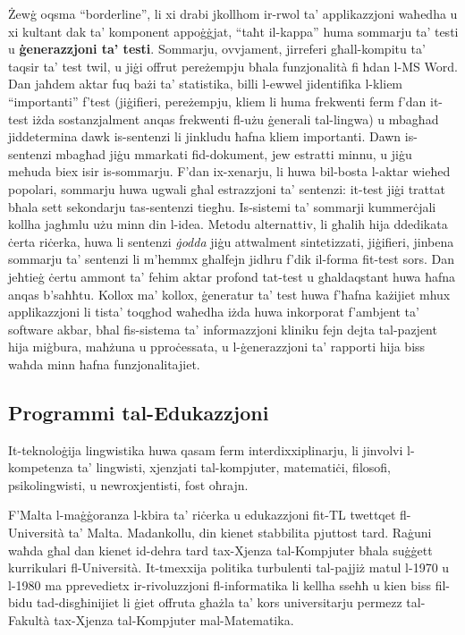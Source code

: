 \documentclass[]{../../metanetpaper}
\begin{document}
\begin{multicols}{2}
Żewġ oqsma ``borderline'', li xi drabi jkollhom ir-rwol ta’ applikazzjoni waħedha u xi kultant dak ta’ komponent appoġġjat, ``taħt il-kappa'' huma sommarju ta’ testi u \textbf{ġenerazzjoni ta’ testi}. Sommarju, ovvjament, jirreferi għall-kompitu ta’ taqsir ta’ test twil, u jiġi offrut pereżempju bħala funzjonalità fi ħdan l-MS Word. Dan jaħdem aktar fuq bażi ta’ statistika, billi l-ewwel jidentifika l-kliem ``importanti'' f’test (jiġifieri, pereżempju, kliem li huma frekwenti ferm f'dan it-test iżda sostanzjalment anqas frekwenti fl-użu ġenerali tal-lingwa) u mbagħad jiddetermina dawk is-sentenzi li jinkludu ħafna kliem importanti. Dawn is-sentenzi mbagħad jiġu mmarkati fid-dokument, jew estratti minnu, u jiġu meħuda biex isir is-sommarju. F’dan ix-xenarju, li huwa bil-bosta l-aktar wieħed popolari, sommarju huwa ugwali għal estrazzjoni ta’ sentenzi: it-test jiġi trattat bħala sett sekondarju tas-sentenzi tiegħu. Is-sistemi ta’ sommarji kummerċjali kollha jagħmlu użu minn din l-idea. Metodu alternattiv, li għalih hija ddedikata ċerta riċerka, huwa li sentenzi \emph{ġodda} jiġu attwalment sintetizzati, jiġifieri, jinbena sommarju ta’ sentenzi li m’hemmx għalfejn jidhru f’dik il-forma fit-test sors. Dan jeħtieġ ċertu ammont ta’ fehim aktar profond tat-test u għaldaqstant huwa ħafna anqas b'saħħtu. Kollox ma’ kollox, ġeneratur ta’ test huwa f’ħafna każijiet mhux applikazzjoni li tista’ toqgħod waħedha iżda huwa inkorporat f’ambjent ta’ software akbar, bħal fis-sistema ta’ informazzjoni kliniku fejn dejta tal-pazjent hija miġbura, maħżuna u pproċessata, u l-ġenerazzjoni ta’ rapporti hija biss waħda minn ħafna funzjonalitajiet.

\subsection{Programmi tal-Edukazzjoni}

It-teknoloġija lingwistika huwa qasam ferm interdixxiplinarju, li jinvolvi l-kompetenza ta’ lingwisti, xjenzjati tal-kompjuter, matematiċi, filosofi, psikolingwisti, u newroxjentisti, fost oħrajn. 

F'Malta l-maġġoranza l-kbira ta’ riċerka u edukazzjoni fit-TL twettqet fl-Università ta’ Malta. Madankollu, din kienet stabbilita pjuttost tard. Raġuni waħda għal dan kienet id-dehra tard tax-Xjenza tal-Kompjuter bħala suġġett kurrikulari fl-Università. It-tmexxija politika turbulenti tal-pajjiż matul l-1970 u l-1980 ma pprevedietx ir-rivoluzzjoni fl-informatika li kellha sseħħ u kien biss fil-bidu tad-disgħinijiet li ġiet offruta għażla ta’ kors universitarju permezz tal-Fakultà tax-Xjenza tal-Kompjuter mal-Matematika.


\end{multicols}
\end{document}
